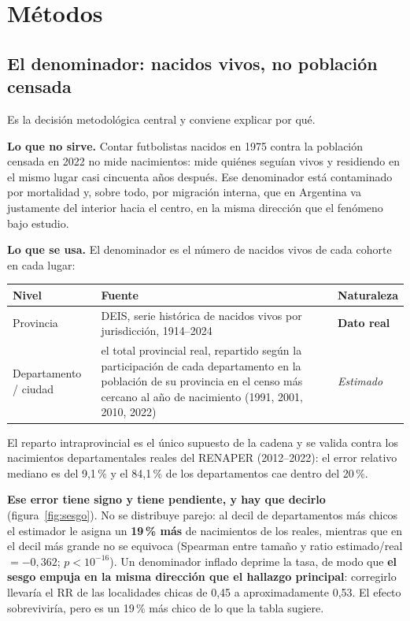 \documentclass[11pt,a4paper]{article}
\begin{document}
\section{Métodos}

\subsection{El denominador: nacidos vivos, no población censada}
\label{sec:denominador}

Es la decisión metodológica central y conviene explicar por qué.

\textbf{Lo que no sirve.} Contar futbolistas nacidos en 1975 contra la población
censada en 2022 no mide nacimientos: mide quiénes seguían vivos y residiendo en
el mismo lugar casi cincuenta años después. Ese denominador está contaminado por
mortalidad y, sobre todo, por migración interna, que en Argentina va justamente
del interior hacia el centro, en la misma dirección que el fenómeno bajo estudio.

\textbf{Lo que se usa.} El denominador es el número de nacidos vivos de cada
cohorte en cada lugar:

\begin{center}\small
\begin{tabular}{@{}lp{7.6cm}l@{}}
\toprule
\textbf{Nivel} & \textbf{Fuente} & \textbf{Naturaleza}\\
\midrule
Provincia & DEIS, serie histórica de nacidos vivos por jurisdicción, 1914--2024
  & \textbf{Dato real}\\[0.4em]
Departamento / ciudad & el total provincial real, repartido según la
  participación de cada departamento en la población de su provincia en el censo
  más cercano al año de nacimiento (1991, 2001, 2010, 2022) & \emph{Estimado}\\
\bottomrule
\end{tabular}
\end{center}

El reparto intraprovincial es el único supuesto de la cadena y se valida contra
los nacimientos departamentales reales del RENAPER (2012--2022): el error
relativo mediano es del 9,1\,\% y el 84,1\,\% de los departamentos cae dentro del
20\,\%.

\textbf{Ese error tiene signo y tiene pendiente, y hay que decirlo}
(figura~\ref{fig:sesgo}). No se distribuye parejo: al decil de departamentos más
chicos el estimador le asigna un \textbf{19\,\% más} de nacimientos de los
reales, mientras que en el decil más grande no se equivoca (Spearman entre tamaño
y ratio estimado/real $= -0{,}362$; $p < 10^{-16}$). Un denominador inflado
deprime la tasa, de modo que \textbf{el sesgo empuja en la misma dirección que el
hallazgo principal}: corregirlo llevaría el RR de las localidades chicas de 0,45
a aproximadamente 0,53. El efecto sobreviviría, pero es un 19\,\% más chico de lo
que la tabla sugiere.
\end{document}
